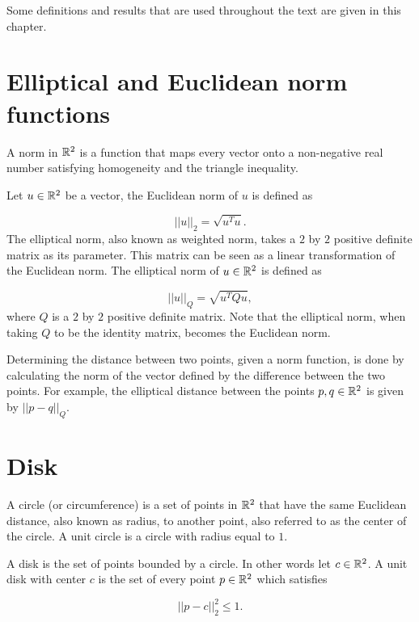 Some definitions and results that are used throughout the text are given in this chapter.

\section{Elliptical and Euclidean norm functions}

A norm in $\mathbb{R}^2$ is a function that maps every vector onto a non-negative real number satisfying homogeneity and the triangle inequality. 

Let $u \in \mathbb{R}^2$ be a vector, the Euclidean norm of $u$ is defined as

\begin{equation*}
||u||_2 = \sqrt{u^{T}u}.
\end{equation*}
The elliptical norm, also known as weighted norm, takes a $2$ by $2$ positive definite matrix as its parameter. This matrix can be seen as a linear transformation of the Euclidean norm. The elliptical norm of $u \in\mathbb{R}^2$ is defined as 

\begin{equation*}
||u||_{Q} = \sqrt{u^{T}Qu},
\end{equation*}
where $Q$ is a $2$ by $2$ positive definite matrix. Note that the elliptical norm, when taking $Q$ to be the identity matrix, becomes the Euclidean norm.

Determining the distance between two points, given a norm function, is done by calculating the norm of the vector defined by the difference between the two points. For example, the elliptical distance between the points $p,q \in \mathbb{R}^2$ is given by $||p-q||_{Q}$.

\section{Disk}

A circle (or circumference) is a set of points in $\mathbb{R}^2$ that have the same Euclidean distance, also known as radius, to another point, also referred to as the center of the circle. A unit circle is a circle with radius equal to $1$.

A disk is the set of points bounded by a circle. In other words let $c \in \mathbb{R}^2$. A unit disk with center $c$ is the set of every point $p \in \mathbb{R}^2$ which satisfies

\begin{equation}\label{eq:disk}
||p-c||_2^2 \le 1.
\end{equation} 


